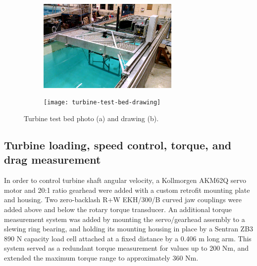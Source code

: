 \begin{figure}
    \centering
    \begin{subfigure}[t]{\textwidth}
        \centering

        \includegraphics[width=0.75\textwidth]{figures/turbine-test-bed-photo}

        \caption{}

        \label{fig:turbine-test-bed-photo}
    \end{subfigure}

    \begin{subfigure}[t]{\textwidth}
        \centering

        \texttt{[image: turbine-test-bed-drawing]}

        \caption{}

        \label{fig:turbine-test-bed-drawing}
    \end{subfigure}

    \caption{Turbine test bed photo (a) and drawing (b).}

    \label{fig:turbine-test-bed}
\end{figure}


\subsection{Turbine loading, speed control, torque, and drag measurement}

In order to control turbine shaft angular velocity, a Kollmorgen AKM62Q servo
motor and 20:1 ratio gearhead were added with a custom retrofit mounting plate
and housing. Two zero-backlash R+W EKH/300/B curved jaw couplings were added
above and below the rotary torque transducer. An additional torque measurement
system was added by mounting the servo/gearhead assembly to a slewing ring
bearing, and holding its mounting housing in place by a Sentran ZB3 890 N
capacity load cell attached at a fixed distance by a 0.406 m long arm. This
system served as a redundant torque measurement for values up to 200 Nm, and
extended the maximum torque range to approximately 360 Nm.

